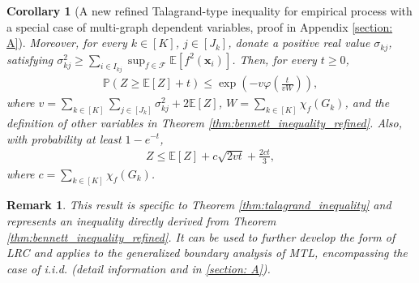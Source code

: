 \documentclass{article}
\def\vx{{\mathbf{x}}}
\def\eE{\mathbb{E}}
\def\pP{\mathbb{P}}
\def\defeq{\overset{\textup{def}}{=}}
\newtheorem{corollary}{Corollary}
\newtheorem*{remark}{Remark}
\begin{document}
\begin{corollary} [A new refined Talagrand-type inequality for empirical process with a special case of  multi-graph dependent variables, proof in Appendix \ref{section: A}]

Moreover, for every $k \in [K]$, $j \in [J_k]$, donate a positive real value $\sigma_{kj}$, satisfying $\sigma_{kj}^2 \geq \sum_{i \in I_{kj}} \sup_{f \in \mathcal{F}} \eE[f^2(\vx_i)]$. Then, for every $t \geq 0$,
\begin{align}
     \pP (Z \geq \eE[Z] + t) \leq \exp \left( - v \varphi \left( \frac{t}{v W}\right) \right) ,
\end{align}
where $v = \sum_{k \in [K]} \sum_{j \in [J_k]} \sigma_{kj}^2 + 2 \eE [Z]$, $W = \sum _{k \in [K]} \chi _f(G_k) $, and the definition of other variables in Theorem \ref{thm:bennett_inequality_refined}. 
Also, with probability at least $1 - e^{-t}$,
\begin{align}
Z \leq \eE[Z] + c \sqrt{2vt} + \frac{2ct}{3} , 
\end{align}
where $c = \sum_{k \in [K]} \chi_{f} (G_k)$.

    \end{corollary}


\begin{remark}
    This result is specific to Theorem \ref{thm:talagrand_inequality} and represents an inequality directly derived from Theorem \ref{thm:bennett_inequality_refined}. It can be used to further develop the form of LRC and applies to the generalized boundary analysis of MTL, encompassing the case of i.i.d. (detail information and in \ref{section: A}). 
\end{remark}
\end{document}
